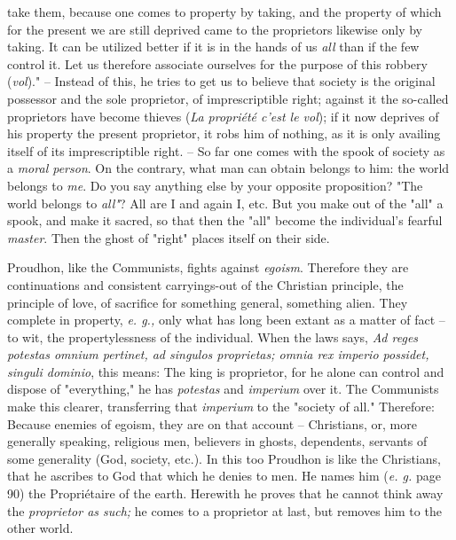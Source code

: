 take them, because one comes to property by taking, and the property of which 
for the present we are still deprived came to the proprietors likewise only by 
taking. It can be utilized better if it is in the hands of us \textit{all} 
than if the few control it. Let us therefore associate ourselves for the 
purpose of this robbery (\textit{vol})."{} -- Instead of this, he tries to get 
us to believe that society is the original possessor and the sole proprietor, 
of imprescriptible right; against it the so-called proprietors have become 
thieves (\textit{La propri\'et\'e c'est le vol}); if it now deprives of his 
property the present proprietor, it robs him of nothing, as it is only 
availing itself of its imprescriptible right. -- So far one comes with the 
spook of society as a \textit{moral person}. On the contrary, what man can 
obtain belongs to him: the world belongs to \textit{me}. Do you say anything 
else by your opposite proposition? "{}The world belongs to \textit{all"{}}? 
All are I and again I, etc. But you make out of the "{}all"{} a spook, and 
make it sacred, so that then the "{}all"{} become the individual's fearful 
\textit{master}. Then the ghost of "{}right"{} places itself on their side.

Proudhon, like the Communists, fights against \textit{egoism}. Therefore they 
are continuations and consistent carryings-out of the Christian principle, the 
principle of love, of sacrifice for something general, something alien. They 
complete in property, \textit{e. g.,} only what has long been extant as a 
matter of fact -- to wit, the propertylessness of the individual. When the 
laws says, \textit{Ad reges potestas omnium pertinet, ad singulos proprietas; 
omnia rex imperio possidet, singuli dominio}, this means: The king is 
proprietor, for he alone can control and dispose of "{}everything,"{} he has 
\textit{potestas} and \textit{imperium} over it. The Communists make this 
clearer, transferring that \textit{imperium} to the "{}society of all."{} 
Therefore: Because enemies of egoism, they are on that account -- Christians, 
or, more generally speaking, religious men, believers in ghosts, dependents, 
servants of some generality (God, society, etc.). In this too Proudhon is like 
the Christians, that he ascribes to God that which he denies to men. He names 
him (\textit{e. g.} page 90) the Propri\'etaire of the earth. Herewith he 
proves that he cannot think away the \textit{proprietor as such;} he comes to 
a proprietor at last, but removes him to the other world.

